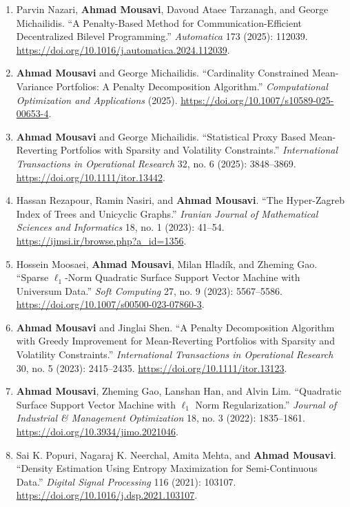 \documentclass[letterpaper,11pt]{article}
\begin{document}
\begin{enumerate}
\item[11.] Parvin Nazari, \textbf{Ahmad Mousavi}, Davoud Ataee Tarzanagh, and George Michailidis. ``A Penalty-Based Method for Communication-Efficient Decentralized Bilevel Programming.'' \textit{Automatica} 173 (2025): 112039. \url{https://doi.org/10.1016/j.automatica.2024.112039}.

\item[10.] \textbf{Ahmad Mousavi} and George Michailidis. ``Cardinality Constrained Mean-Variance Portfolios: A Penalty Decomposition Algorithm.'' \textit{Computational Optimization and Applications} (2025). \url{https://doi.org/10.1007/s10589-025-00653-4}.

\item[9.] \textbf{Ahmad Mousavi} and George Michailidis. ``Statistical Proxy Based Mean-Reverting Portfolios with Sparsity and Volatility Constraints.'' \textit{International Transactions in Operational Research} 32, no. 6 (2025): 3848--3869. \url{https://doi.org/10.1111/itor.13442}.

\item[8.] Hassan Rezapour, Ramin Nasiri, and \textbf{Ahmad Mousavi}. ``The Hyper-Zagreb Index of Trees and Unicyclic Graphs.'' \textit{Iranian Journal of Mathematical Sciences and Informatics} 18, no. 1 (2023): 41--54. \url{https://ijmsi.ir/browse.php?a_id=1356}.

\item[7.] Hossein Moosaei, \textbf{Ahmad Mousavi}, Milan Hladík, and Zheming Gao. ``Sparse $\ell_1$-Norm Quadratic Surface Support Vector Machine with Universum Data.'' \textit{Soft Computing} 27, no. 9 (2023): 5567--5586. \url{https://doi.org/10.1007/s00500-023-07860-3}.

\item[6.] \textbf{Ahmad Mousavi} and Jinglai Shen. ``A Penalty Decomposition Algorithm with Greedy Improvement for Mean-Reverting Portfolios with Sparsity and Volatility Constraints.'' \textit{International Transactions in Operational Research} 30, no. 5 (2023): 2415--2435. \url{https://doi.org/10.1111/itor.13123}.

\item[5.] \textbf{Ahmad Mousavi}, Zheming Gao, Lanshan Han, and Alvin Lim. ``Quadratic Surface Support Vector Machine with $\ell_1$ Norm Regularization.'' \textit{Journal of Industrial \& Management Optimization} 18, no. 3 (2022): 1835--1861. \url{https://doi.org/10.3934/jimo.2021046}.

\item[4.] Sai K. Popuri, Nagaraj K. Neerchal, Amita Mehta, and \textbf{Ahmad Mousavi}. ``Density Estimation Using Entropy Maximization for Semi-Continuous Data.'' \textit{Digital Signal Processing} 116 (2021): 103107. \url{https://doi.org/10.1016/j.dsp.2021.103107}.


\end{enumerate}
\end{document}
